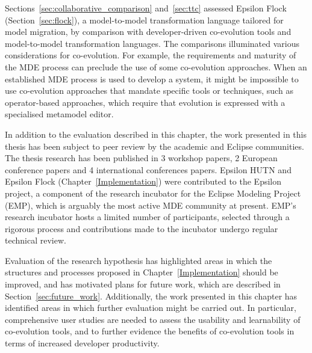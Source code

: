 Sections~\ref{sec:collaborative_comparison} and~\ref{sec:ttc} assessed Epsilon Flock (Section~\ref{sec:flock}), a model-to-model transformation language tailored for model migration, by comparison with developer-driven co-evolution tools and model-to-model transformation languages. The comparisons illuminated various considerations for co-evolution. For example, the requirements and maturity of the MDE process can preclude the use of some co-evolution approaches. When an established MDE process is used to develop a system, it might be impossible to use co-evolution approaches that mandate specific tools or techniques, such as operator-based approaches, which require that evolution is expressed with a specialised metamodel editor.

In addition to the evaluation described in this chapter, the work presented in this thesis has been subject to peer review by the academic and Eclipse communities. The thesis research has been published in 3 workshop papers, 2 European conference papers and 4 international conferences papers. Epsilon HUTN and Epsilon Flock (Chapter~\ref{Implementation}) were contributed to the Epsilon project, a component of the research incubator for the Eclipse Modeling Project (EMP), which is arguably the most active MDE community at present. EMP's research incubator hosts a limited number of participants, selected through a rigorous process and contributions made to the incubator undergo regular technical review. 

Evaluation of the research hypothesis has highlighted areas in which the structures and processes proposed in Chapter~\ref{Implementation} should be improved, and has motivated plans for future work, which are described in Section~\ref{sec:future_work}. Additionally, the work presented in this chapter has identified areas in which further evaluation might be carried out. In particular, comprehensive user studies are needed to assess the usability and learnability of co-evolution tools, and to further evidence the benefits of co-evolution tools in terms of increased developer productivity.